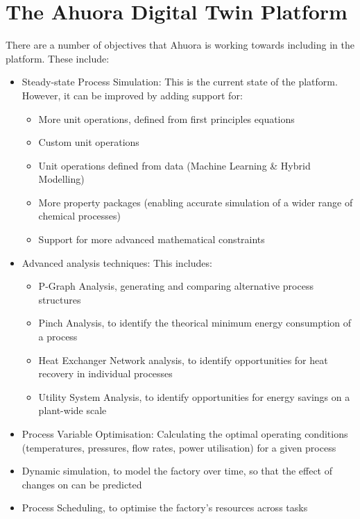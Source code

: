 \section{The Ahuora Digital Twin Platform}

There are a number of objectives that Ahuora is working towards including in the platform. These include:

\begin{itemize}
    \item Steady-state Process Simulation: This is the current state of the platform. However, it can be improved by adding support for:
          \begin{itemize}
              \item More unit operations, defined from first principles equations
              \item Custom unit operations
              \item Unit operations defined from data (Machine Learning \& Hybrid Modelling)
              \item More property packages (enabling accurate simulation of a wider range of chemical processes)
              \item Support for more advanced mathematical constraints
          \end{itemize}
    \item Advanced analysis techniques: This includes:
          \begin{itemize}
              \item P-Graph Analysis, generating and comparing alternative process structures
              \item Pinch Analysis, to identify the theorical minimum energy consumption of a process
              \item Heat Exchanger Network analysis, to identify opportunities for heat recovery in individual processes
              \item Utility System Analysis, to identify opportunities for energy savings on a plant-wide scale
          \end{itemize}
    \item Process Variable Optimisation: Calculating the optimal operating conditions (temperatures, pressures, flow rates, power utilisation) for a given process
    \item Dynamic simulation, to model the factory over time, so that the effect of changes on can be predicted
    \item Process Scheduling, to optimise the factory's resources across tasks

\end{itemize}
